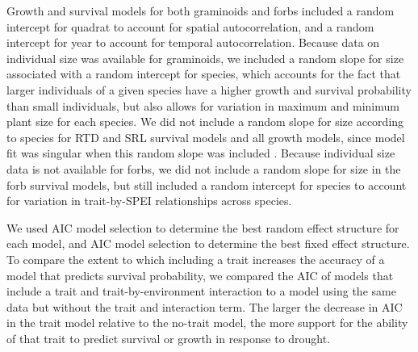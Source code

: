 \documentclass[12pt, letterpaper]{article}
\begin{document}
Growth and survival models for both graminoids and forbs included a random intercept for quadrat to account for spatial autocorrelation, and a random intercept for year to account for temporal autocorrelation. Because data on individual size was available for graminoids, we included a random slope for size associated with a random intercept for species, which accounts for the fact that larger individuals of a given species have a higher growth and survival probability than small individuals, but also allows for variation in maximum and minimum plant size for each species. We did not include a random slope for size according to species for RTD and SRL survival models and all growth models, since model fit was singular when this random slope was included \citep{Bates2015}. 
Because individual size data is not available for forbs, we did not include a random slope for size in the forb survival models, but still included a random intercept for species to account for variation in trait-by-SPEI relationships across species.

We used AIC model selection to determine the best random effect structure for each model, and AIC model selection to determine the best fixed effect structure. To compare the extent to which including a trait increases the accuracy of a model that predicts survival probability, we compared the AIC of models that include a trait and trait-by-environment interaction to a model using the same data but without the trait and interaction term. The larger the decrease in AIC in the trait model relative to the no-trait model, the more support for the ability of that trait to predict survival or growth in response to drought.
\end{document}

